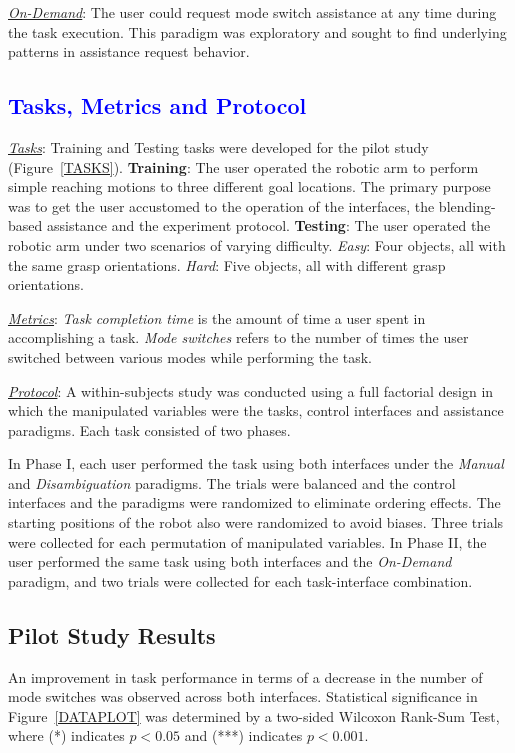 \documentclass[conference]{IEEEtran}
\begin{document}
 \noindent\underline{\textit{On-Demand}}: The user could request mode switch assistance at any time during the task execution. This paradigm was exploratory and sought to find underlying patterns in assistance request behavior.
 
\subsection{\textcolor{blue}{Tasks, Metrics and Protocol}}

\noindent\underline{\textit{Tasks}}: Training and Testing tasks were developed for the pilot study (Figure~\ref{TASKS}). \textbf{Training}: The user operated the robotic arm to perform simple reaching motions to three different goal locations. The primary purpose was to get the user accustomed to the operation of the interfaces, the blending-based assistance and the experiment protocol. \textbf{Testing}: The user operated the robotic arm under two scenarios of varying difficulty. \textit{Easy}: Four objects, all with the same grasp orientations. \textit{Hard}: Five objects, all with different grasp orientations.

\noindent\underline{\textit{Metrics}}: \textit{Task completion time} is the amount of time a user spent in accomplishing a task. \textit{Mode switches} refers to the number of times the user switched between various modes while performing the task. 

\noindent\underline{\textit{Protocol}}: A within-subjects study was conducted using a full factorial design in which the manipulated variables were the tasks, control interfaces and assistance paradigms. Each task consisted of two phases. 

In Phase I, each user performed the task using both interfaces under the \textit{Manual} and \textit{Disambiguation} paradigms. The trials were balanced and the control interfaces and the paradigms were randomized to eliminate ordering effects. The starting positions of the robot also were randomized to avoid biases. Three trials were collected for each permutation of manipulated variables. 
In Phase II, the user performed the same task using both interfaces and the \textit{On-Demand} paradigm, and two trials were collected for each task-interface combination.  

\subsection{Pilot Study Results}\label{RES}
An improvement in task performance in terms of a decrease in the number of mode switches was observed across both interfaces. Statistical significance in Figure~\ref{DATAPLOT} was determined by a two-sided Wilcoxon Rank-Sum Test, where (*) indicates $p < 0.05$ and (***) indicates $p < 0.001$.
\end{document}
